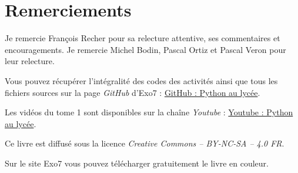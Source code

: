 
\clearemptydoublepage
\pagestyle{empty}\thispagestyle{empty}

\vspace*{\fill}

\section*{Remerciements}


Je remercie François Recher pour sa relecture attentive, ses commentaires et encouragements. Je remercie Michel Bodin, Pascal Ortiz et Pascal Veron pour leur relecture.


\bigskip

\begin{center}
Vous pouvez récupérer l'intégralité des codes \Python{} des activités ainsi que tous les fichiers sources sur la page \emph{GitHub} d'Exo7 :
\href{https://github.com/exo7math/python2-exo7}{\og{}GitHub : Python au lycée\fg{}}.

\medskip

Les vidéos du tome 1 sont disponibles sur la chaîne \emph{Youtube} :
\href{https://www.youtube.com/channel/UC6PiFyqBiUjiJ7Q3DRSW2Wg}{\og{}Youtube : Python au lycée\fg{}}.


\end{center}


\vspace*{\fill}

\bigskip 

\begin{center}
\end{center}



\begin{center}
Ce livre est diffusé sous la licence \emph{Creative Commons -- BY-NC-SA -- 4.0 FR}.

Sur le site Exo7 vous pouvez télécharger gratuitement le livre en couleur.
\end{center}




\printindex
{}

